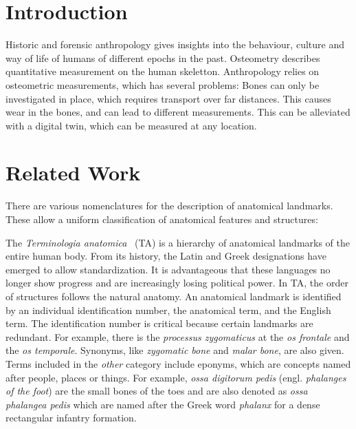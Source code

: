 \documentclass[sw]{iosart2x}
\newcommand{\aw}{AnthroWorks3D}
\begin{document}
\begin{frontmatter}
\begin{abstract}
Anthropology relies on osteometric measurements of human bones, but ...
In this paper, first, we describe the anthropology domain.
Then, we discuss design decisions of modelling ANNO.
Next, we show how ANNO is published for the community.
Finally, we describe the integration of the ontology into \aw{}.
\end{abstract}

\begin{keyword}
\end{keyword}

\end{frontmatter}


\section{Introduction}\label{sec:introduction}
Historic and forensic anthropology gives insights into the behaviour, culture and way of life of humans of different epochs in the past.
Osteometry describes quantitative measurement on the human skeletton.
Anthropology relies on osteometric measurements, which has several problems:
Bones can only be investigated in place, which requires transport over far distances.
This causes wear in the bones, and can lead to different measurements.
This can be alleviated with a digital twin, which can be measured at any location.

\section{Related Work}
There are various nomenclatures for the description of anatomical landmarks.
These allow a uniform classification of anatomical features and structures:

The \emph{Terminologia anatomica}~\citep{ta2} (TA) is a hierarchy of anatomical landmarks of the entire human body.
From its history, the Latin and Greek designations have emerged to allow standardization.
It is advantageous that these languages no longer show progress and are increasingly losing political power. 
In TA, the order of structures follows the natural anatomy.
An anatomical landmark is identified by an individual identification number, the anatomical term, and the English term.
The identification number is critical because certain landmarks are redundant.
For example, there is the \emph{processus zygomaticus} at the \emph{os frontale} and the \emph{os temporale}.
Synonyms, like \emph{zygomatic bone} and \emph{malar bone}, are also given.
Terms included in the \emph{other} category include eponyms, which are concepts named after people, places or things.
For example, \emph{ossa digitorum pedis} (engl. \emph{phalanges of the foot}) are the small bones of the toes and are also denoted as \emph{ossa phalangea pedis} which are named after the Greek word \emph{phalanx} for a dense rectangular infantry formation.
\end{document}
